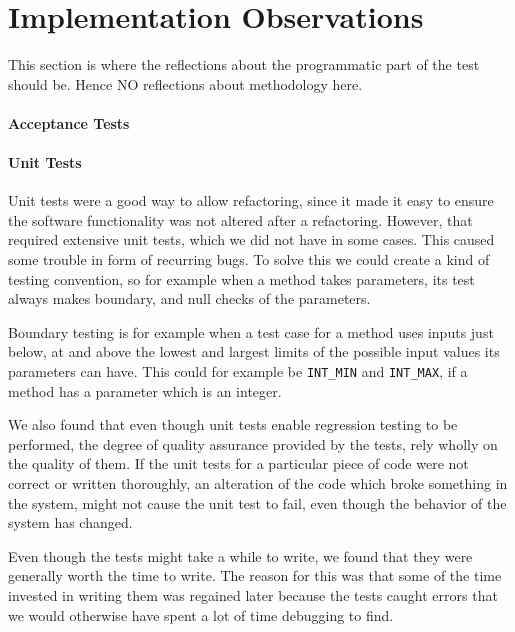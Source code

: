 \section{Implementation Observations}
This section is where the reflections about the programmatic part of the test should be. Hence NO reflections about methodology here.

\paragraph{Acceptance Tests}

\paragraph{Unit Tests}
Unit tests were a good way to allow refactoring, since it made it easy to ensure the software functionality was not altered after a refactoring. However, that required extensive unit tests, which we did not have in some cases. This caused some trouble in form of recurring bugs. To solve this we could create a kind of testing convention, so for example when a method takes parameters, its test always makes boundary, and null checks of the parameters.%

Boundary testing is for example when a test case for a method uses inputs just below, at and above the lowest and largest limits of the possible input values its parameters can have. This could for example be \texttt{INT\_MIN} and \texttt{INT\_MAX}, if a method has a parameter which is an integer.

We also found that even though unit tests enable regression testing to be performed, the degree of quality assurance provided by the tests, rely wholly on the quality of them. If the unit tests for a particular piece of code were not correct or written thoroughly, an alteration of the code which broke something in the system, might not cause the unit test to fail, even though the behavior of the system has changed.

Even though the tests might take a while to write, we found that they were generally worth the time to write. The reason for this was that some of the time invested in writing them was regained later because the tests caught errors that we would otherwise have spent a lot of time debugging to find.

